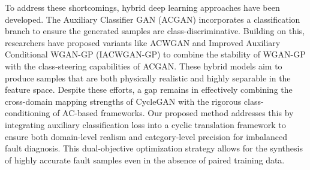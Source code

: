 To address these shortcomings, hybrid deep learning approaches have been developed. The Auxiliary Classifier GAN (ACGAN) \cite{5} incorporates a classification branch to ensure the generated samples are class-discriminative. Building on this, researchers have proposed variants like ACWGAN \cite{35} and Improved Auxiliary Conditional WGAN-GP (IACWGAN-GP) \cite{26} to combine the stability of WGAN-GP with the class-steering capabilities of ACGAN. These hybrid models aim to produce samples that are both physically realistic and highly separable in the feature space. Despite these efforts, a gap remains in effectively combining the cross-domain mapping strengths of CycleGAN with the rigorous class-conditioning of AC-based frameworks. Our proposed method addresses this by integrating auxiliary classification loss into a cyclic translation framework to ensure both domain-level realism and category-level precision for imbalanced fault diagnosis. This dual-objective optimization strategy allows for the synthesis of highly accurate fault samples even in the absence of paired training data.

